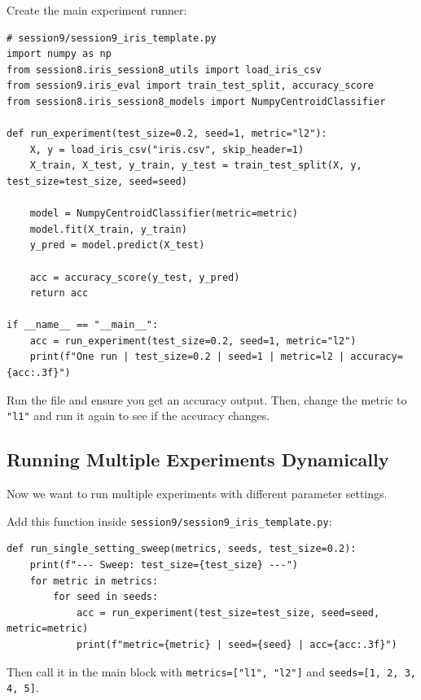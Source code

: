 \begin{tcolorbox}[title=Do: Update \texttt{session9/session9\_iris\_template.py}]
Create the main experiment runner:
\begin{verbatim}
# session9/session9_iris_template.py
import numpy as np
from session8.iris_session8_utils import load_iris_csv
from session9.iris_eval import train_test_split, accuracy_score
from session8.iris_session8_models import NumpyCentroidClassifier

def run_experiment(test_size=0.2, seed=1, metric="l2"):
    X, y = load_iris_csv("iris.csv", skip_header=1)
    X_train, X_test, y_train, y_test = train_test_split(X, y, test_size=test_size, seed=seed)

    model = NumpyCentroidClassifier(metric=metric)
    model.fit(X_train, y_train)
    y_pred = model.predict(X_test)

    acc = accuracy_score(y_test, y_pred)
    return acc

if __name__ == "__main__":
    acc = run_experiment(test_size=0.2, seed=1, metric="l2")
    print(f"One run | test_size=0.2 | seed=1 | metric=l2 | accuracy={acc:.3f}")
\end{verbatim}
\end{tcolorbox}

\begin{tcolorbox}[title=Checkpoint]
Run the file and ensure you get an accuracy output. Then, change the metric to \texttt{"l1"} and run it again to see if the accuracy changes.
\end{tcolorbox}

\newpage
\subsection{Running Multiple Experiments Dynamically}

Now we want to run multiple experiments with different parameter settings.

\begin{tcolorbox}[title=Do: Implement Looped Output]
Add this function inside \texttt{session9/session9\_iris\_template.py}:

\begin{verbatim}
def run_single_setting_sweep(metrics, seeds, test_size=0.2):
    print(f"--- Sweep: test_size={test_size} ---")
    for metric in metrics:
        for seed in seeds:
            acc = run_experiment(test_size=test_size, seed=seed, metric=metric)
            print(f"metric={metric} | seed={seed} | acc={acc:.3f}")
\end{verbatim}

Then call it in the main block with \texttt{metrics=["l1", "l2"]} and \texttt{seeds=[1, 2, 3, 4, 5]}.
\end{tcolorbox}

